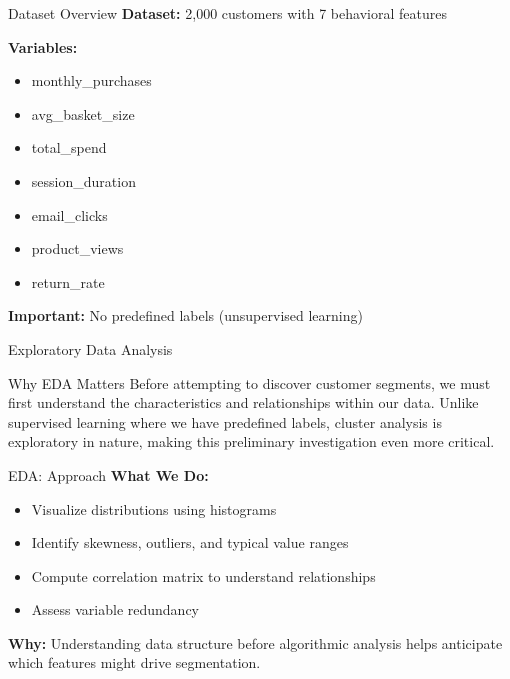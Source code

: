 \documentclass[aspectratio=169,ignorenonframetext]{beamer}
\begin{document}
\begin{frame}{Dataset Overview}
\textbf{Dataset:} 2,000 customers with 7 behavioral features

\textbf{Variables:}

\begin{itemize}
\item
  monthly\_purchases
\item
  avg\_basket\_size
\item
  total\_spend
\item
  session\_duration
\item
  email\_clicks
\item
  product\_views
\item
  return\_rate
\end{itemize}

\textbf{Important:} No predefined labels (unsupervised learning)
\end{frame}

\begin{frame}{Exploratory Data Analysis}
\begin{block}{Why EDA Matters}
Before attempting to discover customer segments, we must first
understand the characteristics and relationships within our data. Unlike
supervised learning where we have predefined labels, cluster analysis is
exploratory in nature, making this preliminary investigation even more
critical.
\end{block}
\end{frame}

\begin{frame}{EDA: Approach}
\textbf{What We Do:}

\begin{itemize}
\item
  Visualize distributions using histograms
\item
  Identify skewness, outliers, and typical value ranges
\item
  Compute correlation matrix to understand relationships
\item
  Assess variable redundancy
\end{itemize}

\textbf{Why:} Understanding data structure before algorithmic analysis
helps anticipate which features might drive segmentation.
\end{frame}
\end{document}
